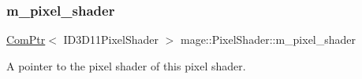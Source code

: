 \subsubsection{\texorpdfstring{m\+\_\+pixel\+\_\+shader}{m\_pixel\_shader}}
{\footnotesize\ttfamily \hyperlink{namespacemage_ae74f374780900893caa5555d1031fd79}{Com\+Ptr}$<$ I\+D3\+D11\+Pixel\+Shader $>$ mage\+::\+Pixel\+Shader\+::m\+\_\+pixel\+\_\+shader\hspace{0.3cm}{\ttfamily [protected]}}

A pointer to the pixel shader of this pixel shader. 